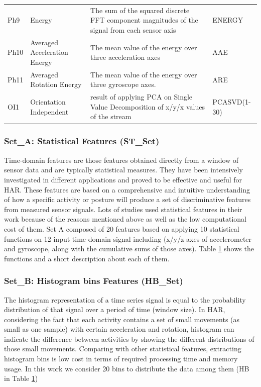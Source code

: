 \documentclass[journal,article,submit,moreauthors,pdftex]{Definitions/mdpi}
\begin{document}
\begin{table}[H]
\begin{tabular}{p{0.9cm}p{5cm}p{7cm}p{1.3cm}}
		Ph9&Energy&{\scriptsize The sum of the squared discrete FFT component magnitudes of the signal from each sensor axis} & ENERGY \\
		Ph10&Averaged Acceleration Energy&{\scriptsize The mean value of the energy over three acceleration axes} & AAE \\
		Ph11&Averaged Rotation Energy&{\scriptsize The mean value of the energy over three gyroscope axes. } & ARE \\
		OI1&Orientation Independent&{\scriptsize result of applying PCA on Single Value Decomposition  of x/y/x values of the stream } & PCASVD(1-30) \\
		\bottomrule
	\end{tabular}
	\label{features_table}
\end{table}
\subsubsection{Set\_A: Statistical Features (ST\_Set)}
Time-domain features are those features obtained directly from a window of sensor data and are typically statistical measures. They have been intensively investigated in different applications and proved to be effective and useful for HAR. These features are based on a comprehensive and intuitive understanding of how a specific activity or posture will produce a set of discriminative features from measured sensor signals. Lots of studies used statistical features in their work because of the reasons mentioned above as well as the low computational cost of them. Set A composed of 20 features based on applying 10 statistical functions on 12 input time-domain signal including (x/y/z axes of accelerometer and gyroscope, along with the cumulative sums of those axes). Table \ref{features_table} shows the functions and a short description about each of them.


\subsubsection{Set\_B: Histogram bins Features (HB\_Set)}
The histogram representation of a time series signal is equal to the probability distribution of that signal over a period of time (window size). In HAR, considering the fact that each activity contains a set of small movements (as small as one sample) with certain acceleration and rotation, histogram can indicate the difference between activities by showing the different distributions of those small movements. Comparing with other statistical features, extracting histogram bins is low cost in terms of required processing time and memory usage\cite{Sarbishei2019platform}. In this work we consider 20 bins to distribute the data among them (HB in Table \ref{features_table})
\end{document}
